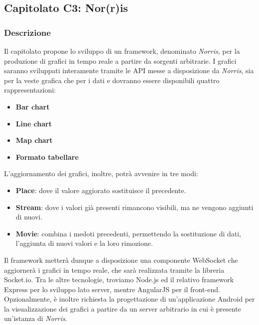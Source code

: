 
\subsection{Capitolato C3: Nor(r)is}

\subsubsection{Descrizione}
Il capitolato propone lo sviluppo di un framework, denominato \emph{Norris}, per la produzione di grafici in tempo reale a partire da sorgenti arbitrarie. I grafici saranno sviluppati interamente tramite le API messe a disposizione da \emph{Norris}, sia per la veste grafica che per i dati e dovranno essere disponibili quattro rappresentazioni:
\begin{itemize}
\item \textbf{Bar chart}
\item \textbf{Line chart}
\item \textbf{Map chart}
\item \textbf{Formato tabellare}
\end{itemize}
L'aggiornamento dei grafici, inoltre, potrà avvenire in tre modi: 
\begin{itemize}
\item \textbf{Place}: dove il valore aggiorato sostituisce il precedente.
\item \textbf{Stream}: dove i valori già presenti rimancono visibili, ma ne vengono aggiunti di nuovi.
\item \textbf{Movie}: combina i medoti precedenti, permettendo la sostituzione di dati, l'aggiunta di nuovi valori e la loro rimozione.
\end{itemize}
Il framework metterà dunque a disposizione una componente WebSocket che aggiornerà i grafici in tempo reale, che sarà realizzata tramite la libreria Socket.io. Tra le altre tecnologie, troviamo Node.js ed il relativo framework Express per lo sviluppo lato server, mentre AngularJS per il front-end. Opzionalmente, è inoltre richiesta la progettazione di un'applicazione Android per la visualizzazione dei grafici a partire da un server arbitrario in cui è presente un'istanza di \emph{Norris}.


